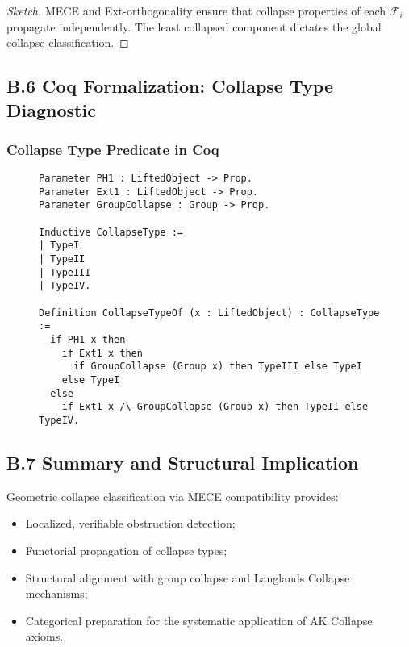 \documentclass[11pt]{article}
\begin{document}
\begin{proof}[Sketch]
MECE and Ext-orthogonality ensure that collapse properties of each \( \mathcal{F}_i \) propagate independently. The least collapsed component dictates the global collapse classification.
\end{proof}

\subsection*{B.6 Coq Formalization: Collapse Type Diagnostic}

\subsubsection*{Collapse Type Predicate in Coq}

\begin{figure}[h]
\centering
\begin{lstlisting}[language=Coq, caption=Collapse Type Assignment]
Parameter PH1 : LiftedObject -> Prop.
Parameter Ext1 : LiftedObject -> Prop.
Parameter GroupCollapse : Group -> Prop.

Inductive CollapseType :=
| TypeI
| TypeII
| TypeIII
| TypeIV.

Definition CollapseTypeOf (x : LiftedObject) : CollapseType :=
  if PH1 x then
    if Ext1 x then
      if GroupCollapse (Group x) then TypeIII else TypeI
    else TypeI
  else
    if Ext1 x /\ GroupCollapse (Group x) then TypeII else TypeIV.
\end{lstlisting}
\end{figure}

\subsection*{B.7 Summary and Structural Implication}

Geometric collapse classification via MECE compatibility provides:

\begin{itemize}
    \item Localized, verifiable obstruction detection;
    \item Functorial propagation of collapse types;
    \item Structural alignment with group collapse and Langlands Collapse mechanisms;
    \item Categorical preparation for the systematic application of AK Collapse axioms.
\end{itemize}
\end{document}
